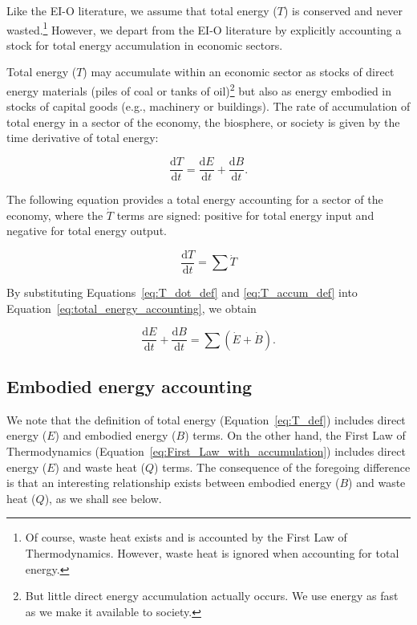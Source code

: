 Like the EI-O literature, we assume that total energy ($T$) is conserved
and never wasted.\footnote{Of course, waste heat exists and is
	accounted by the First Law of Thermodynamics. 
	However, waste heat is ignored when accounting for total energy.}
However, we depart from the EI-O literature by explicitly
accounting a stock 
for total energy accumulation
in economic sectors. 

Total energy ($T$) may accumulate within an economic sector 
as stocks of direct energy materials 
(piles of coal or tanks of oil)\footnote{But little direct
	energy accumulation actually occurs.
	We use energy as fast as we make it available to society.}
but also as energy embodied in stocks of capital goods 
(e.g., machinery or buildings). 
The rate of accumulation of total energy
in a sector of the economy, the biosphere, 
or society is given by the time derivative of total energy:

\begin{equation} \label{eq:T_accum_def}
	\frac{\mathrm{d}T}{\mathrm{d}t} 
	= \frac{\mathrm{d}E}{\mathrm{d}t} 
	+ \frac{\mathrm{d}B}{\mathrm{d}t}.
\end{equation}

The following equation provides a total energy accounting 
for a sector of the economy, where the $\dot{T}$ terms
are signed: positive for total energy input and negative
for total energy output.

\begin{equation} \label{eq:total_energy_accounting}
		\frac{\mathrm{d}T}{\mathrm{d}t}
		= \sum \dot{T}
\end{equation}

By substituting Equations~\ref{eq:T_dot_def} and
\ref{eq:T_accum_def} into 
Equation~\ref{eq:total_energy_accounting},
we obtain

\begin{equation} \label{eq:total_energy_accounting_details}
	\frac{\mathrm{d}E}{\mathrm{d}t} 
	+ \frac{\mathrm{d}B}{\mathrm{d}t}
	= \sum{\left( \dot{E} 
			+ \dot{B} \right)}.
\end{equation}


\subsection{Embodied energy accounting}

We note that the definition of total energy 
(Equation~\ref{eq:T_def}) includes direct energy ($E$) 
and embodied energy ($B$) terms. 
On the other hand, the First Law of Thermodynamics
(Equation~\ref{eq:First_Law_with_accumulation})
includes direct energy ($E$) and waste heat ($Q$) terms. 
The consequence of the foregoing difference is that 
an interesting relationship exists between embodied energy ($B$) 
and waste heat ($Q$), as we shall see below. 


